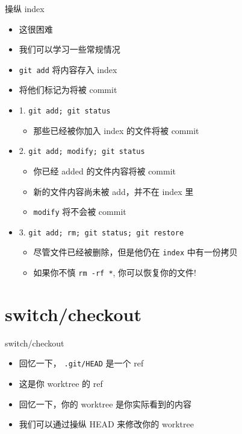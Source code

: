 \documentclass[aspectratio=169]{beamer}
\newcommand{\T}[1]{\texttt{#1}}
\begin{document}
\begin{frame}{操纵 index}
  \begin{itemize}
    \item<1-> 这很困难
    \item<1-> 我们可以学习一些常规情况
    \item<1-> \T{git add} 将内容存入 index
    \item<1-> 将他们标记为将被 commit
    \item<2-> 1. \T{git add; git status}\begin{itemize}
      \item 那些已经被你加入 index 的文件将被 commit
    \end{itemize}
    \item<3-> 2. \T{git add; modify; git status}\begin{itemize}
      \item 你已经 added 的文件内容将被 commit
	  \item 新的文件内容尚未被 add，并不在 index 里
      \item \T{modify} 将不会被 commit
    \end{itemize}
    \item<4-> 3. \T{git add; rm; git status; git restore}\begin{itemize}
      \item 尽管文件已经被删除，但是他仍在 \T{index} 中有一份拷贝
      \item 如果你不慎 \T{rm -rf *}, 你可以恢复你的文件! 
    \end{itemize}
  \end{itemize}
\end{frame}

\section{switch/checkout}
\begin{frame}{switch/checkout}
  \begin{itemize}
    \item 回忆一下， \T{.git/HEAD} 是一个 ref
    \item 这是你 worktree 的 ref
    \item 回忆一下，你的 worktree 是你实际看到的内容
    \item 我们可以通过操纵 HEAD 来修改你的 worktree 
  \end{itemize}
\end{frame}
\end{document}
